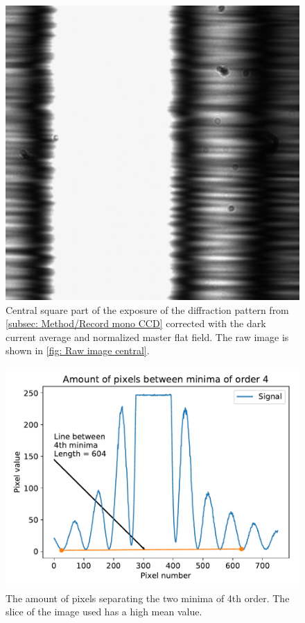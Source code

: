 \documentclass{emulateapj}
\begin{document}
\begin{figure}
	\centering	
	\includegraphics[scale=0.6]{./pythonscripts/corrected_I.pdf}
	\caption[Corrected image]{Central square part of the exposure of the diffraction pattern from \cref{subsec: Method/Record mono CCD} corrected with the dark current average and normalized master flat field. The raw image is shown in \cref{fig: Raw image central}.}
	\label{fig: Corrected image central}
\end{figure}

\begin{figure}
	\centering
	\includegraphics[width=\linewidth]{./pythonscripts/pixellength.pdf}
	\caption[Counting pixels between minima]{The amount of pixels separating the two minima of 4th order. The slice of the image used has a high mean value.}
	\label{fig: Pixel size}
\end{figure}
\end{document}
